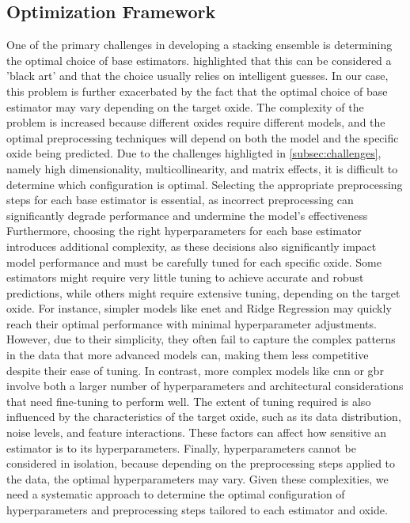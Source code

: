 \subsection{Optimization Framework}\label{sec:optimization_framework}
One of the primary challenges in developing a stacking ensemble is determining the optimal choice of base estimators. \citet{wolpertstacked_1992} highlighted that this can be considered a 'black art' and that the choice usually relies on intelligent guesses. 
In our case, this problem is further exacerbated by the fact that the optimal choice of base estimator may vary depending on the target oxide. 
The complexity of the problem is increased because different oxides require different models, and the optimal preprocessing techniques will depend on both the model and the specific oxide being predicted. 
Due to the challenges highligted in \ref{subsec:challenges}, namely high dimensionality, multicollinearity, and matrix effects, it is difficult to determine which configuration is optimal.
Selecting the appropriate preprocessing steps for each base estimator is essential, as incorrect preprocessing can significantly degrade performance and undermine the model's effectiveness
Furthermore, choosing the right hyperparameters for each base estimator introduces additional complexity, as these decisions also significantly impact model performance and must be carefully tuned for each specific oxide. 
Some estimators might require very little tuning to achieve accurate and robust predictions, while others might require extensive tuning, depending on the target oxide. 
For instance, simpler models like \gls{enet} and Ridge Regression may quickly reach their optimal performance with minimal hyperparameter adjustments. However, due to their simplicity, they often fail to capture the complex patterns in the data that more advanced models can, making them less competitive despite their ease of tuning.
In contrast, more complex models like \gls{cnn} or \gls{gbr} involve both a larger number of hyperparameters and architectural considerations that need fine-tuning to perform well.
The extent of tuning required is also influenced by the characteristics of the target oxide, such as its data distribution, noise levels, and feature interactions. 
These factors can affect how sensitive an estimator is to its hyperparameters.
Finally, hyperparameters cannot be considered in isolation, because depending on the preprocessing steps applied to the data, the optimal hyperparameters may vary.
Given these complexities, we need a systematic approach to determine the optimal configuration of hyperparameters and preprocessing steps tailored to each estimator and oxide.

